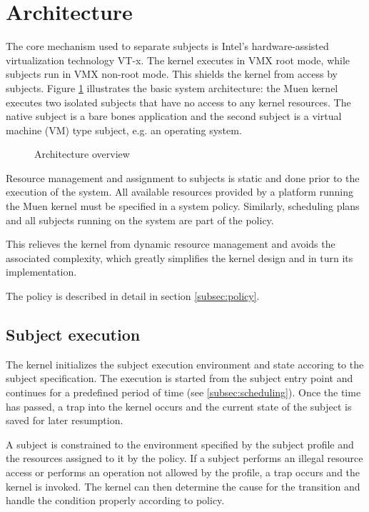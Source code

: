 \section{Architecture}
The core mechanism used to separate subjects is Intel's hardware-assisted
virtualization technology VT-x. The kernel executes in VMX root mode, while
subjects run in VMX non-root mode. This shields the kernel from access by
subjects. Figure \ref{fig:architecture-overview} illustrates the basic system
architecture: the Muen kernel executes two isolated subjects that have no
access to any kernel resources. The native subject is a bare bones application
and the second subject is a virtual machine (VM) type subject, e.g. an
operating system.

\begin{figure}[h]
	\centering
	
	\caption{Architecture overview}
	\label{fig:architecture-overview}
\end{figure}

Resource management and assignment to subjects is static and done prior to the
execution of the system. All available resources provided by a platform running
the Muen kernel must be specified in a system policy. Similarly, scheduling
plans and all subjects running on the system are part of the policy.

This relieves the kernel from dynamic resource management and avoids the
associated complexity, which greatly simplifies the kernel design and in turn
its implementation.

The policy is described in detail in section \ref{subsec:policy}.

\subsection{Subject execution}
The kernel initializes the subject execution environment and state accoring to
the subject specification. The execution is started from the subject entry point
and continues for a predefined period of time (see \ref{subsec:scheduling}).
Once the time has passed, a trap into the kernel occurs and the current state of
the subject is saved for later resumption.

A subject is constrained to the environment specified by the subject profile and
the resources assigned to it by the policy. If a subject performs an illegal
resource access or performs an operation not allowed by the profile, a trap
occurs and the kernel is invoked. The kernel can then determine the cause for
the transition and handle the condition properly according to policy.

